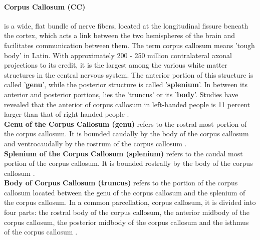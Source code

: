 \documentclass[../structure.tex]{subfiles}
\begin{document}
		\paragraph{Corpus Callosum (CC)} is a wide, flat bundle of nerve fibers, located at the longitudinal fissure beneath the cortex, which acts a link between the two hemispheres of the brain and facilitates communication between them. The term corpus callosum means 'tough body' in Latin. With approximately 200 - 250 million contralateral axonal projections to its credit, it is the largest among the various white matter structures in the central nervous system.
The anterior portion of this structure is called '\textbf{genu}', while the posterior structure is called '\textbf{splenium}'. In between its anterior and posterior portions, lies the 'truncus' or its '\textbf{body}'. Studies have revealed that the anterior of corpus callosum in left-handed people is 11 percent larger than that of right-handed people \cite{PDD2015}.\\
		\textbf{Genu of the Corpus Callosum (genu)}
		 refers to the rostral most portion of the corpus callosum. It is bounded caudally by the body of the corpus callosum and ventrocaudally by the rostrum of the corpus callosum \cite{Washington1994}.\\
		\textbf{Splenium of the Corpus Callosum (splenium)}
		 refers to the caudal most portion of the corpus callosum. It is bounded rostrally by the body of the corpus callosum \cite{Washington1994}.\\
\textbf{Body of Corpus Callosum (truncus)} 
		 refers to the portion of the corpus callosum located between the genu of the corpus callosum and the splenium of the corpus callosum. In a common parcellation, corpus callosum, it is divided into four parts: the rostral body of the corpus callosum, the anterior midbody of the corpus callosum, the posterior midbody of the corpus callosum and the isthmus of the corpus callosum \cite{Washington1994}.
\end{document}
